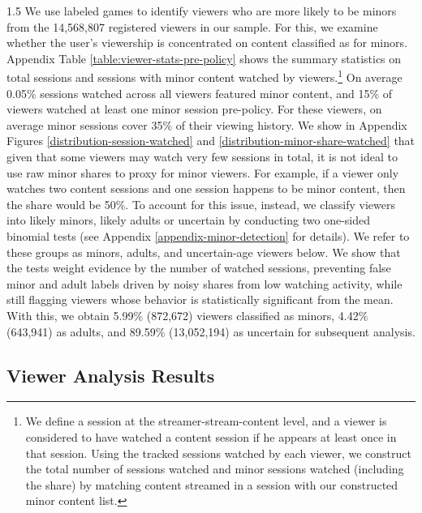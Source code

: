 \documentclass[a4paper,12pt]{article}
\begin{document}
\begin{spacing}{1.5}
We use labeled games to identify viewers who are more likely to be minors from the 14,568,807 registered viewers in our sample. For this, we examine whether the user's viewership is concentrated on content classified as for minors. Appendix Table \ref{table:viewer-stats-pre-policy} shows the summary statistics on total sessions and sessions with minor content watched by viewers.\footnote{We define a session at the streamer-stream-content level, and a viewer is considered to have watched a content session if he appears at least once in that session. Using the tracked sessions watched by each viewer, we construct the total number of sessions watched and minor sessions watched (including the share) by matching content streamed in a session with our constructed minor content list.} On average 0.05\% sessions watched across all viewers featured minor content, and 15\% of viewers watched at least one minor session pre-policy. For these viewers, on average minor sessions cover 35\% of their viewing history. We show in Appendix Figures \ref{distribution-session-watched} and \ref{distribution-minor-share-watched} that given that some viewers may watch very few sessions in total, it is not ideal to use raw minor shares to proxy for minor viewers. For example, if a viewer only watches two content sessions and one session happens to be minor content, then the share would be 50\%. To account for this issue, instead, we classify viewers into likely minors, likely adults or uncertain by conducting two one-sided binomial tests (see Appendix \ref{appendix-minor-detection} for details). We refer to these groups as minors, adults, and uncertain-age viewers below. We show that the tests weight evidence by the number of watched sessions, preventing false minor and adult labels driven by noisy shares from low watching activity, while still flagging viewers whose behavior is statistically significant from the mean. With this, we obtain 5.99\% (872,672) viewers classified as minors, 4.42\% (643,941) as adults, and 89.59\% (13,052,194) as uncertain for subsequent analysis. 


\subsection{Viewer Analysis Results}\label{subsection-minor-results}


\end{spacing}
\end{document}
